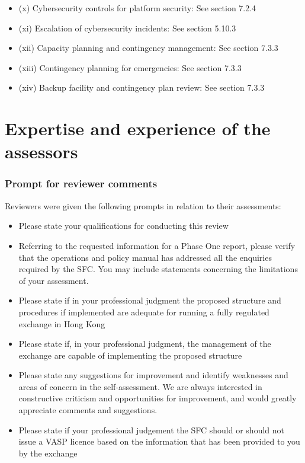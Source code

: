\documentclass[]{report}
\begin{document}
\begin{itemize}
\begin{itemize}
\item (x) Cybersecurity controls for platform security: See section 7.2.4
\item (xi) Escalation of cybersecurity incidents: See section 5.10.3
\item (xii) Capacity planning and contingency management: See section 7.3.3
\item (xiii) Contingency planning for emergencies: See section 7.3.3
\item (xiv) Backup facility and contingency plan review: See section 7.3.3
\end{itemize}
\end{itemize}

\chapter{Expertise and experience of the assessors}


\subsection{Prompt for reviewer comments}
Reviewers were given the following prompts in relation to their
assessments:

\begin{itemize}
\item  Please state your qualifications for conducting this review

\item Referring to the requested information for a Phase One report,
  please verify that the operations and policy manual has addressed
  all the enquiries required by the SFC.  You may include statements
  concerning the limitations of your assessment.

\item Please state if in your professional judgment the proposed
  structure and procedures if implemented are adequate for running a
  fully regulated exchange in Hong Kong

\item Please state if, in your professional judgment, the management
  of the exchange are capable of implementing the proposed structure

\item Please state any suggestions for improvement and identify
  weaknesses and areas of concern in the self-assessment.  We are
  always interested in constructive criticism and opportunities for
  improvement, and would greatly appreciate comments and suggestions.

\item Please state if your professional judgement the SFC should or
  should not issue a VASP licence based on the information that has
  been provided to you by the exchange
\end{itemize}
\end{document}
